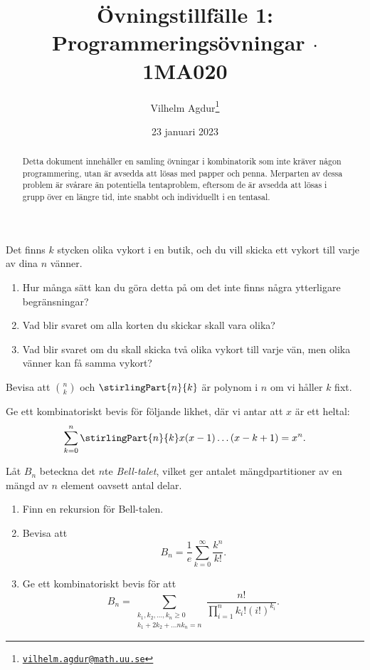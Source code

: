 \documentclass[nobib]{tufte-handout}
\title{Övningstillfälle 1: Programmeringsövningar $\cdot$ 1MA020}
\author[Vilhelm Agdur]{Vilhelm Agdur\thanks{\href{mailto:vilhelm.agdur@math.uu.se}{\nolinkurl{vilhelm.agdur@math.uu.se}}}}
\date{23 januari 2023}
\begin{document}
\maketitle%

\begin{abstract}
\noindent
Detta dokument innehåller en samling övningar i kombinatorik som inte kräver någon programmering, utan är avsedda att lösas med papper och penna. Merparten av dessa problem är svårare än potentiella tentaproblem, eftersom de är avsedda att lösas i grupp över en längre tid, inte snabbt och individuellt i en tentasal.
\end{abstract}

\begin{xca}
    Det finns $k$ stycken olika vykort i en butik, och du vill skicka ett vykort till varje av dina $n$ vänner.

    \begin{enumerate}
        \item Hur många sätt kan du göra detta på om det inte finns några ytterligare begränsningar?
        \item Vad blir svaret om alla korten du skickar skall vara olika?
        \item Vad blir svaret om du skall skicka två olika vykort till varje vän, men olika vänner kan få samma vykort?
    \end{enumerate}
\end{xca}

\begin{xca}
    Bevisa att $\binom{n}{k}$ och $\stirlingPart{n}{k}$ är polynom i $n$ om vi håller $k$ fixt.
\end{xca}

\begin{xca}
    Ge ett kombinatoriskt bevis för följande likhet, där vi antar att $x$ är ett heltal:
    $$\sum_{k = 0}^{n} \stirlingPart{n}{k}x(x-1)\ldots(x-k+1) = x^n.$$
\end{xca}

\begin{xca}
    Låt $B_n$ beteckna det $n$te \emph{Bell-talet}, vilket ger antalet mängdpartitioner av en mängd av $n$ element oavsett antal delar.

    \begin{enumerate}[label = \roman*)]
        \item Finn en rekursion för Bell-talen.
        \item Bevisa att
        $$B_n = \frac{1}{e}\sum_{k = 0}^{\infty} \frac{k^n}{k!}.$$
        \item Ge ett kombinatoriskt bevis för att
        $$B_n = \sum_{\substack{k_1, k_2, \ldots, k_n \geq 0\\k_1 + 2k_2 + \ldots nk_n = n}} \frac{n!}{\prod_{i=1}^{n} k_i!(i!)^{k_i}}.$$
    \end{enumerate}
\end{xca}
\end{document}

